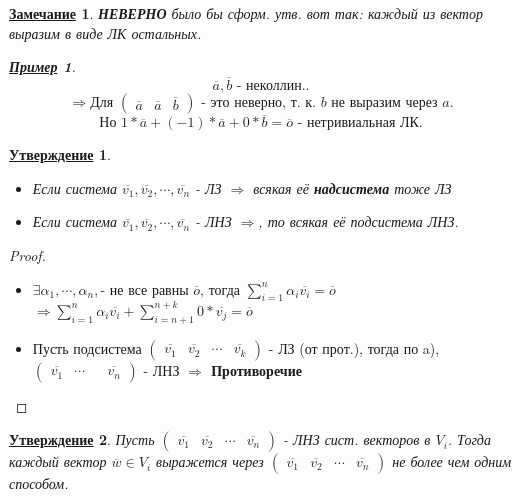\documentclass[12pt]{article}
\newtheorem{statement}{\underline{Утверждение}}[section]
\newtheorem*{note}{\underline{Замечание}}
\newtheorem*{example}{\underline{Пример}}
\theoremstyle{definition}
\theoremstyle{definition}
\begin{document}
\begin{note}
\textbf{НЕВЕРНО }было бы сформ. утв. вот так: каждый из вектор выразим в виде ЛК остальных.
\begin{example}
\[
\overline{a}, \overline{b} \text{ - неколлин.}
.\] 
\[
    \Rightarrow \text{Для } \begin{pmatrix} \overline{a} & \overline{a} & \overline{b} \end{pmatrix} \text{ - это неверно, т. к. $b$ не выразим через $a$}
.\] 
\[
\text{Но } 1 * \overline{a} + (-1) * \overline{a} + 0 * \overline{b} = \overline{o} \text{ - нетривиальная ЛК}.
\] 
\end{example}

\end{note}
\begin{statement}
    \begin{itemize}
        \item [a) ] Если система $\overline{v_1}, \overline{v_2}, \cdots , \overline{v_n}$ - ЛЗ $\Rightarrow$ всякая её \textbf{надсистема} тоже ЛЗ
        \item Если система $\overline{v_1}, \overline{v_2}, \cdots, \overline{v_n}$ - ЛНЗ $\Rightarrow$, то всякая её подсистема ЛНЗ. 
    \end{itemize}
\end{statement}
\begin{proof}
\begin{itemize}
    \item [a) ] $\exists \alpha_1, \cdots , \alpha_n, \text{- не все равны $\overline{o}$}$, тогда $\sum_{i = 1}^{n} \alpha_i \overline{v_i} = \overline{o}$
         $\Rightarrow \sum_{i = 1}^{n}  \alpha_i \overline{v_i} + \sum_{i = n + 1}^{n + k} 0 * \overline{v_j} = \overline{o}$
         \item [b) ] Пусть подсистема $\begin{pmatrix} \overline{v_1} & \overline{v_2} & \cdots & \overline{v_k} \end{pmatrix}$ - ЛЗ (от прот.), тогда по a), $\begin{pmatrix} \overline{v_1} & \cdots  && \overline{v_n} \end{pmatrix}$ - ЛНЗ \textbf{$ \Rightarrow $ Противоречие }
\end{itemize}
\end{proof}

\begin{statement}
    Пусть $\begin{pmatrix}\overline{v_1} & \overline{v_2} & \cdots & \overline{v_n} \end{pmatrix}$ - ЛНЗ сист. векторов в $V_i$. Тогда каждый вектор $\overline{w} \in  V_i$ выражется через $\begin{pmatrix}\overline{v_1} & \overline{v_2} & \cdots & \overline{v_n} \end{pmatrix}$ не более чем одним способом.
\end{statement}
\end{document}

